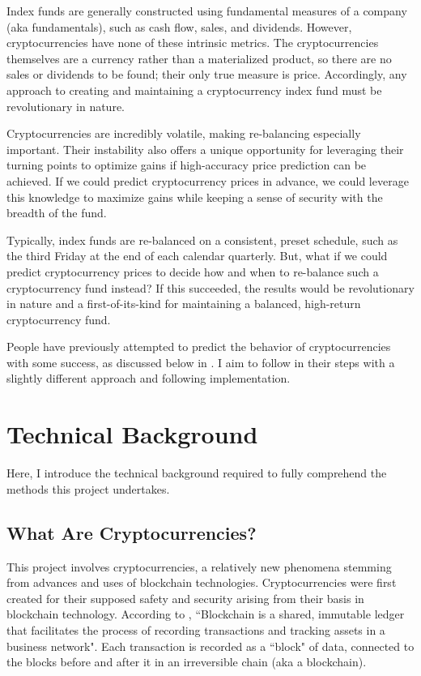 \documentclass[10pt,twocolumn]{article}
\begin{document}
Index funds are generally constructed using fundamental measures of a company (aka fundamentals), such as cash flow, sales, and dividends. However, cryptocurrencies have none of these intrinsic metrics. The cryptocurrencies themselves are a currency rather than a materialized product, so there are no sales or dividends to be found; their only true measure is price. Accordingly, any approach to creating and maintaining a cryptocurrency index fund must be revolutionary in nature.

Cryptocurrencies are incredibly volatile, making re-balancing especially important. Their instability also offers a unique opportunity for leveraging their turning points to optimize gains if high-accuracy price prediction can be achieved. If we could predict cryptocurrency prices in advance, we could leverage this knowledge to maximize gains while keeping a sense of security with the breadth of the fund.

Typically, index funds are re-balanced on a consistent, preset schedule, such as the third Friday at the end of each calendar quarterly. But, what if we could predict cryptocurrency prices to decide how and when to re-balance such a cryptocurrency fund instead? If this succeeded, the results would be revolutionary in nature and a first-of-its-kind for maintaining a balanced, high-return cryptocurrency fund.

People have previously attempted to predict the behavior of cryptocurrencies with some success, as discussed below in . I aim to follow in their steps with a slightly different approach and following implementation.

\section{Technical Background} \label{technicalbackground}

Here, I introduce the technical background required to fully comprehend the methods this project undertakes.

\subsection{What Are Cryptocurrencies?}

This project involves cryptocurrencies, a relatively new phenomena stemming from advances and uses of blockchain technologies. Cryptocurrencies were first created for their supposed safety and security arising from their basis in blockchain technology. According to \textcite{WhatIsBlockchain}, ``Blockchain is a shared, immutable ledger that facilitates the process of recording transactions and tracking assets in a business network". Each transaction is recorded as a ``block" of data, connected to the blocks before and after it in an irreversible chain (aka a blockchain).
\end{document}
